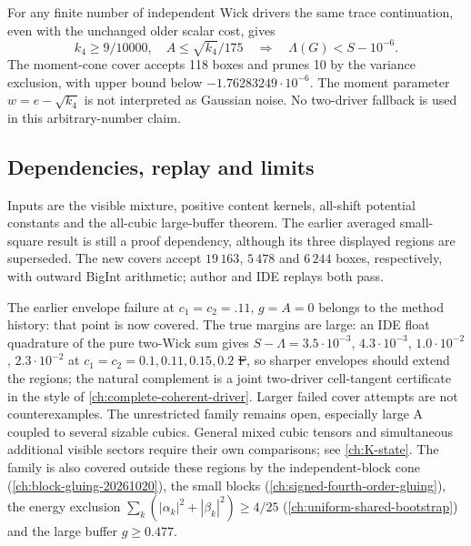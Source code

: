 For any finite number of independent Wick drivers the same trace
continuation, even with the unchanged older scalar cost, gives
\[
 \boxed{k_4\ge9/10000,\quad A\le\sqrt{k_4}/175
 \quad\Longrightarrow\quad\Lambda(G)<S-10^{-6}.}
\]
The moment-cone cover accepts 118 boxes and prunes 10 by the variance
exclusion, with upper bound below $-1.76283249\cdot10^{-6}$.
The moment parameter $w=e-\sqrt{k_4}$ is not interpreted as Gaussian
noise. No two-driver fallback is used in this arbitrary-number claim.

\subsection{Dependencies, replay and limits}
Inputs are the visible mixture, positive content kernels, all-shift
potential constants and the all-cubic large-buffer theorem. The earlier
averaged small-square result is still a proof dependency, although
its three displayed regions are superseded.
The new covers accept $19\,163$, $5\,478$ and $6\,244$ boxes,
respectively, with outward BigInt arithmetic; author and IDE replays both pass.

The earlier envelope failure at $c_1=c_2=.11$, $g=A=0$ belongs to the
method history: that point is now covered. The true margins are large: an IDE float quadrature of the pure two-Wick sum gives $S-\Lambda=3.5\cdot10^{-3}$,
$4.3\cdot10^{-3}$, $1.0\cdot10^{-2}$, $2.3\cdot10^{-2}$ at $c_1=c_2=0.1,0.11,0.15,0.2$ \st{F}, so sharper envelopes should extend the regions; the natural complement is
a joint two-driver cell-tangent certificate in the style of \autoref{ch:complete-coherent-driver}. Larger failed cover attempts
are not counterexamples. The unrestricted family remains open,
especially large A coupled to several sizable cubics.
General mixed cubic tensors and simultaneous additional visible sectors
require their own comparisons; see \autoref{ch:K-state}. The family is also covered outside these regions by the independent-block cone (\autoref{ch:block-gluing-20261020}), the small blocks (\autoref{ch:signed-fourth-order-gluing}), the energy exclusion $\sum_k(|\alpha_k|^2+|\beta_k|^2)\ge4/25$ (\autoref{ch:uniform-shared-bootstrap}) and the large buffer $g\ge0.477$.



